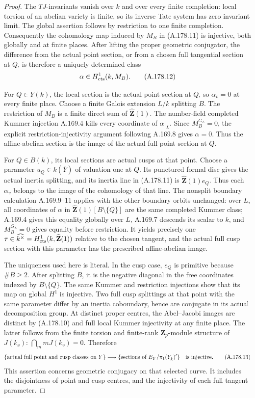 \begin{proof}
The \(TJ\)-invariants vanish over \(k\) and over every finite
completion: local torsion of an abelian variety is finite, so
its inverse Tate system has zero invariant limit.  The global
assertion follows by restriction to one finite completion.
Consequently the cohomology map induced by \(M_B\) in
(A.178.11) is injective, both globally and at finite places.
After lifting the proper geometric conjugator, the difference
from the actual point section, or from a chosen full
tangential section at \(Q\), is therefore a uniquely determined
class
\[
                         \alpha\in H^1_{\rm cts}(k,M_B).
\tag{A.178.12}
\]

For \(Q\in Y(k)\), the local section is the actual point
section at \(Q\), so \(\alpha_v=0\) at every finite place.
Choose a finite Galois extension \(L/k\) splitting \(B\).
The restriction of \(M_B\) is a finite direct sum of
\(\widehat{\mathbf Z}(1)\).  The number-field completed
Kummer injection A.169.4 kills every coordinate of
\(\alpha|_L\).  Since \(M_B^{G_L}=0\), the explicit
restriction-injectivity argument following A.169.8 gives
\(\alpha=0\).  Thus the affine-abelian section is the
image of the actual full point section at \(Q\).

For \(Q\in B(k)\), its local sections are actual cusps at
that point.  Choose a parameter \(u_Q\in k(\bar Y)\) of
valuation one at \(Q\).  Its punctured formal disc gives
the actual inertia splitting, and its inertia line in
(A.178.11) is \(\widehat{\mathbf Z}(1)e_Q\).
Thus each \(\alpha_v\) belongs to the image of the
cohomology of that line.  The nonsplit boundary calculation
A.169.9--11 applies with the other boundary orbits unchanged:
over \(L\), all coordinates of \(\alpha\) in
\(\widehat{\mathbf Z}(1)[B\setminus\{Q\}]\) are the same
completed Kummer class; A.169.4 gives this equality globally
over \(L\), A.169.7 descends its scalar to \(k\), and
\(M_B^{G_L}=0\) gives equality before restriction.
It yields precisely one
\(\tau\in\widehat{k^\times}=H^1_{\rm cts}(k,\widehat{\mathbf Z}(1))\)
relative to the chosen tangent, and the actual full cusp
section with this parameter has the prescribed affine-abelian
image.

The uniqueness used here is literal.  In the cusp case,
\(e_Q\) is primitive because \(\#B\ge2\).  After splitting
\(B\), it is the negative diagonal in the free coordinates
indexed by \(B\setminus\{Q\}\).  The same Kummer and
restriction injections show that its map on global
\(H^1\) is injective.  Two full cusp splittings at that
point with the same parameter differ by an inertia
coboundary, hence are conjugate in its actual decomposition
group.  At distinct proper centres, the Abel--Jacobi
images are distinct by (A.178.10) and full local Kummer
injectivity at any finite place.  The latter follows from
the finite torsion and finite-rank \(\mathbf Z_p\)-module
structure of \(J(k_v)\): \(\bigcap_m mJ(k_v)=0\).
Therefore
\[
 \{\hbox{actual full point and cusp classes on }Y\}
       \longrightarrow
 \{\hbox{sections of }E_Y/\pi_1(Y_{\bar k})'\}
 \quad\hbox{is injective}.
\tag{A.178.13}
\]
This assertion concerns geometric conjugacy on that selected
curve.  It includes the disjointness of point and cusp
centres, and the injectivity of each full tangent parameter.


\end{proof}
